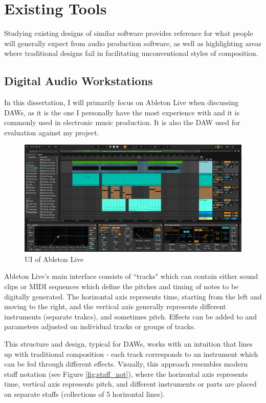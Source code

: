 \documentclass[12pt,a4paper,twoside,openright]{report}
\begin{document}
\section{Existing Tools}
Studying existing designs of similar software provides reference for what people will generally expect from audio production software, as well as highlighting areas where traditional designs fail in facilitating unconventional styles of composition.

\subsection{Digital Audio Workstations}
In this dissertation, I will primarily focus on Ableton Live when discussing DAWs, as it is the one I personally have the most experience with and it is commonly used in electronic music production. It is also the DAW used for evaluation against my project.

\begin{figure}[h]
    \centering
    \includegraphics[scale=0.3]{images/ableton example.png}
    \caption{UI of Ableton Live}
    \label{fig:ableton}
\end{figure}

Ableton Live's main interface consists of ``tracks" which can contain either sound clips or MIDI sequences which define the pitches and timing of notes to be digitally generated. The horizontal axis represents time, starting from the left and moving to the right, and the vertical axis generally represents different instruments (separate trakcs), and sometimes pitch. Effects can be added to and parameters adjusted on individual tracks or groups of tracks. 

This structure and design, typical for DAWs, works with an intuition that lines up with traditional composition - each track corresponds to an instrument which can be fed through different effects. Visually, this approach resembles modern staff notation (see Figure \ref{fig:staff_not}), where the horizontal axis represents time, vertical axis represents pitch, and different instruments or parts are placed on separate staffs (collections of 5 horizontal lines).
\end{document}
